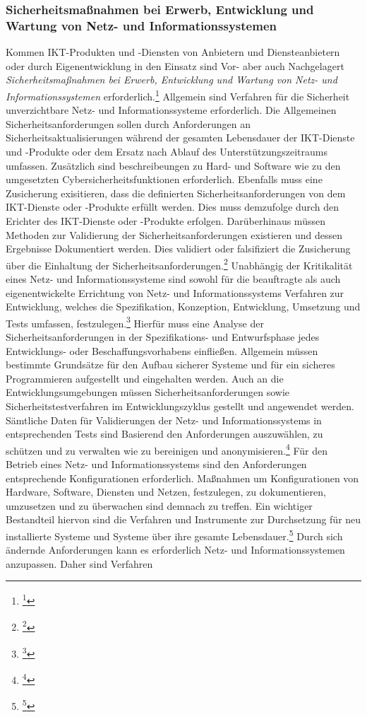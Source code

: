 \documentclass[11pt,a4paper,hidelinks]{article}   %
\begin{document}
            \subsubsection{Sicherheitsmaßnahmen bei Erwerb, Entwicklung und Wartung von Netz- und Informationssystemen}
            Kommen IKT-Produkten und -Diensten von Anbietern und Diensteanbietern oder durch Eigenentwicklung in den Einsatz sind Vor- aber auch Nachgelagert \emph{Sicherheitsmaßnahmen bei Erwerb, Entwicklung und Wartung von Netz- und Informationssystemen} erforderlich.\footnote{\footcite[Vgl.][, Anhang, Nummer 6.1.1.]{EU2024-2690}} Allgemein sind Verfahren für die Sicherheit unverzichtbare Netz- und Informationssysteme erforderlich. Die Allgemeinen Sicherheitsanforderungen sollen durch Anforderungen an Sicherheitsaktualisierungen während der gesamten Lebensdauer der IKT-Dienste und -Produkte oder dem Ersatz nach Ablauf des Unterstützungszeitraums umfassen. Zusätzlich sind beschreibeungen zu Hard- und Software wie zu den umgesetzten Cybersicherheitsfunktionen erforderlich. Ebenfalls muss eine Zusicherung exisitieren, dass die definierten Sicherheitsanforderungen von dem IKT-Dienste oder -Produkte erfüllt werden. Dies muss demzufolge durch den Erichter des IKT-Dienste oder -Produkte erfolgen. Darüberhinaus müssen Methoden zur Validierung der Sicherheitsanforderungen existieren und dessen Ergebnisse Dokumentiert werden. Dies validiert oder falsifiziert die Zusicherung über die Einhaltung der Sicherheitsanforderungen.\footnote{\footcite[Vgl.][, Anhang, Nummer 6.1.2.]{EU2024-2690}} Unabhängig der Kritikalität eines Netz- und Informationssysteme sind sowohl für die beauftragte als auch eigenentwickelte Errichtung von Netz- und Informationssystems Verfahren zur Entwicklung, welches die Spezifikation, Konzeption, Entwicklung, Umsetzung und Tests umfassen, festzulegen.\footnote{\footcite[Vgl.][, Anhang, Nummer 6.2.1. \& 6.2.3.]{EU2024-2690}} Hierfür muss eine Analyse der Sicherheitsanforderungen in der Spezifikations- und Entwurfsphase jedes Entwicklungs- oder Beschaffungsvorhabens einfließen. Allgemein müssen bestimmte Grundsätze für den Aufbau sicherer Systeme und für ein sicheres Programmieren aufgestellt und eingehalten werden. Auch an die Entwicklungsumgebungen müssen Sicherheitsanforderungen sowie Sicherheitstestverfahren im Entwicklungszyklus gestellt und angewendet werden. Sämtliche Daten für Validierungen der Netz- und Informationssystems in entsprechenden Tests sind Basierend den Anforderungen auszuwählen, zu schützen und zu verwalten wie zu bereinigen und anonymisieren.\footnote{\footcite[Vgl.][, Anhang, Nummer 6.2.2.]{EU2024-2690}} Für den Betrieb eines Netz- und Informationssystems sind den Anforderungen entsprechende Konfigurationen erforderlich. Maßnahmen um Konfigurationen von Hardware, Software, Diensten und Netzen, festzulegen, zu dokumentieren, umzusetzen und zu überwachen sind demnach zu treffen. Ein wichtiger Bestandteil hiervon sind die Verfahren und Instrumente zur Durchsetzung für neu installierte Systeme und Systeme über ihre gesamte Lebensdauer.\footnote{\footcite[Vgl.][, Anhang, Nummer 6.3.1. \& 6.3.2.]{EU2024-2690}} Durch sich ändernde Anforderungen kann es erforderlich Netz- und Informationssystemen anzupassen. Daher sind Verfahren 
\end{document}

